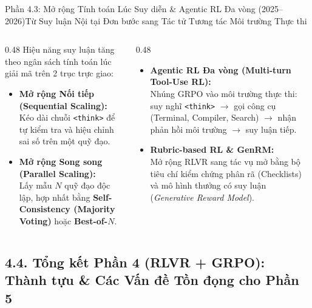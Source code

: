 \begin{frame}{Phần 4.3: Mở rộng Tính toán Lúc Suy diễn \& Agentic RL Đa vòng (2025--2026)}{Từ Suy luận Nội tại Đơn bước sang Tác tử Tương tác Môi trường Thực thi}
  \begin{columns}[T,onlytextwidth]
    \begin{column}{0.48\textwidth}
      \footnotesize
      Hiệu năng suy luận tăng theo ngân sách tính toán lúc giải mã trên 2 trục trực giao:
      \begin{itemize}\setlength{\itemsep}{5pt}
        \item \textbf{Mở rộng Nối tiếp (Sequential Scaling):}\\
          Kéo dài chuỗi \texttt{<think>} để tự kiểm tra và hiệu chỉnh sai số trên một quỹ đạo.
        \item \textbf{Mở rộng Song song (Parallel Scaling):}\\
          Lấy mẫu $N$ quỹ đạo độc lập, hợp nhất bằng \textbf{Self-Consistency (Majority Voting)} hoặc \textbf{Best-of-$N$}.
      \end{itemize}
    \end{column}
    \begin{column}{0.48\textwidth}
      \footnotesize
      \begin{itemize}\setlength{\itemsep}{5pt}
        \item \textbf{Agentic RL Đa vòng (Multi-turn Tool-Use RL):}\\
          Nhúng GRPO vào môi trường thực thi: suy nghĩ \texttt{<think>} $\to$ gọi công cụ (Terminal, Compiler, Search) $\to$ nhận phản hồi môi trường $\to$ suy luận tiếp.
        \item \textbf{Rubric-based RL \& GenRM:}\\
          Mở rộng RLVR sang tác vụ mở bằng bộ tiêu chí kiểm chứng phân rã (Checklists) và mô hình thưởng có suy luận (\textit{Generative Reward Model}).
      \end{itemize}
    \end{column}
  \end{columns}
\end{frame}

\subsection{4.4. Tổng kết Phần 4 (RLVR + GRPO): Thành tựu \& Các Vấn đề Tồn đọng cho Phần 5}

